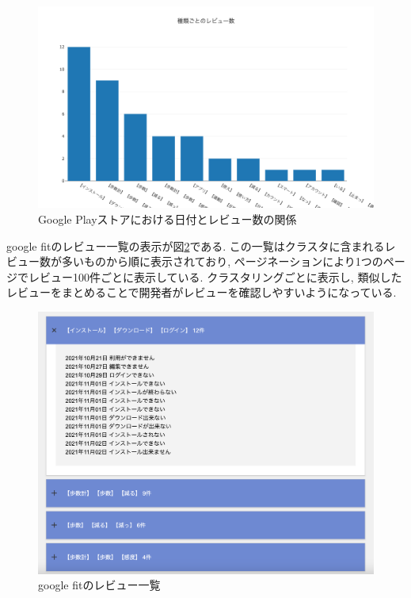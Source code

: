 \begin{figure}[hbtp]
  \centering
  \includegraphics[scale=0.3]
    {contents/images/top10.png}
  \caption{Google Playストアにおける日付とレビュー数の関係\label{fig:top10}}
\end{figure}

google fitのレビュー一覧の表示が図\ref{fig:review_items}である. この一覧はクラスタに含まれるレビュー数が多いものから順に表示されており, ページネーションにより1つのページでレビュー100件ごとに表示している. 
クラスタリングごとに表示し, 類似したレビューをまとめることで開発者がレビューを確認しやすいようになっている. 

\begin{figure}[hbtp]
  \centering
  \includegraphics[scale=0.3]
    {contents/images/review_items.png}
  \caption{google fitのレビュー一覧\label{fig:review_items}}
\end{figure}

